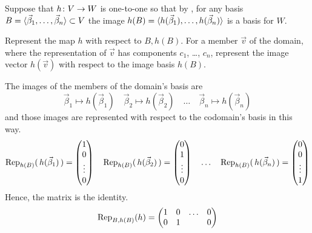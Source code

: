 \begin{exercises}
\begin{answer}
\begin{exparts}
      \end{exparts}  
    \end{answer}
  \item 
    Suppose that \( \map{h}{V}{W} \) is one-to-one so that 
    by , for any basis
    \( B=\sequence{\vec{\beta}_1,\dots,\vec{\beta}_n}\subset V \) the image
    \( h(B)=\sequence{h(\vec{\beta}_1),\dots,h(\vec{\beta}_n)} \)
    is a basis for \( W \).
    \begin{exparts}
      \partsitem Represent the map $h$ with respect to $B,h(B)$.
      \partsitem For a member $\vec{v}$ of the domain, where
        the representation of $\vec{v}$ has components $c_1$, \ldots, $c_n$,
        represent the image vector \( h(\vec{v}) \) with respect to 
        the image basis $h(B)$.
    \end{exparts}
    \begin{answer}
      \begin{exparts}
        \partsitem The images of the members of the domain's basis are
          \begin{equation*}
            \vec{\beta}_1\mapsto h(\vec{\beta}_1)
            \quad 
            \vec{\beta}_2\mapsto h(\vec{\beta}_2)
            \quad\ldots\quad 
            \vec{\beta}_n\mapsto h(\vec{\beta}_n)
          \end{equation*}
          and those images are represented with respect to the codomain's
          basis in this way.
          \begin{equation*}
            \rep{\,h(\vec{\beta}_1)\,}{h(B)}=\colvec{1 \\ 0 \\ \vdots \\ 0}
            \quad
            \rep{\,h(\vec{\beta}_2)\,}{h(B)}=\colvec{0 \\ 1 \\ \vdots \\ 0}
            \quad\ldots\quad
            \rep{\,h(\vec{\beta}_n)\,}{h(B)}=\colvec{0 \\ 0 \\ \vdots \\ 1}
          \end{equation*}
          Hence, the matrix is the identity.
          \begin{equation*}
            \rep{h}{B,h(B)}
            =\begin{pmatrix}
               1  &0  &\ldots  &0  \\
               0  &1  &        &0  \\

\end{pmatrix}
\end{equation*}
\end{exparts}
\end{answer}
\end{exercises}
